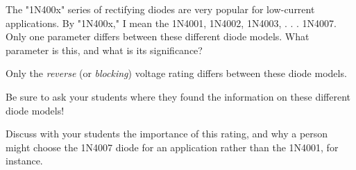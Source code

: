 

The "1N400x" series of rectifying diodes are very popular for low-current applications.  By "1N400x," I mean the 1N4001, 1N4002, 1N4003, . . . 1N4007.  Only one parameter differs between these different diode models.  What parameter is this, and what is its significance?







Only the {\it reverse} (or {\it blocking}) voltage rating differs between these diode models.







Be sure to ask your students where they found the information on these different diode models!

Discuss with your students the importance of this rating, and why a person might choose the 1N4007 diode for an application rather than the 1N4001, for instance.





